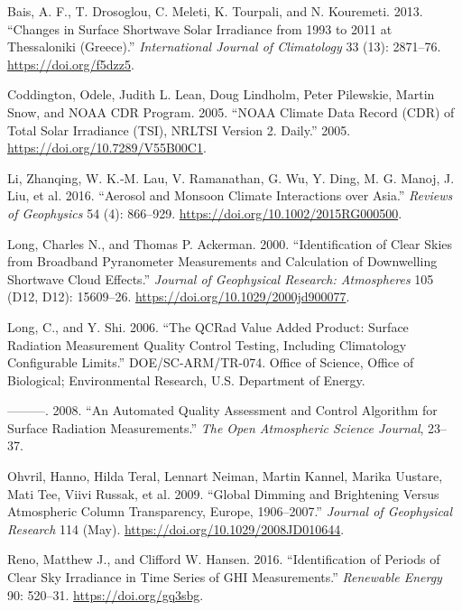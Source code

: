 \documentclass[
  preprint, 3p, authoryear]{article}
\newlength{\cslhangindent}
\newlength{\cslentryspacingunit} %
\newenvironment{CSLReferences}[2] %
 {%
  \setlength{\parindent}{0pt}
  \ifodd #1
  \let\oldpar\par
  \def\par{\hangindent=\cslhangindent\oldpar}
  \fi
  \setlength{\parskip}{#2\cslentryspacingunit}
 }%
 {}
\begin{document}
\hypertarget{refs}{}
\begin{CSLReferences}{1}{0}
\leavevmode{}%
Bais, A. F., T. Drosoglou, C. Meleti, K. Tourpali, and N. Kouremeti. 2013. {``Changes in Surface Shortwave Solar Irradiance from 1993 to 2011 at Thessaloniki (Greece).''} \emph{International Journal of Climatology} 33 (13): 2871--76. \url{https://doi.org/f5dzz5}.

\leavevmode{}%
Coddington, Odele, Judith L. Lean, Doug Lindholm, Peter Pilewskie, Martin Snow, and NOAA CDR Program. 2005. {``{NOAA} Climate Data Record ({CDR}) of Total Solar Irradiance ({TSI}), {NRLTSI} Version 2. {D}aily.''} 2005. \url{https://doi.org/10.7289/V55B00C1}.

\leavevmode{}%
Li, Zhanqing, W. K.‐M. Lau, V. Ramanathan, G. Wu, Y. Ding, M. G. Manoj, J. Liu, et al. 2016. {``Aerosol and Monsoon Climate Interactions over Asia.''} \emph{Reviews of Geophysics} 54 (4): 866--929. \url{https://doi.org/10.1002/2015RG000500}.

\leavevmode{}%
Long, Charles N., and Thomas P. Ackerman. 2000. {``Identification of Clear Skies from Broadband Pyranometer Measurements and Calculation of Downwelling Shortwave Cloud Effects.''} \emph{Journal of Geophysical Research: Atmospheres} 105 (D12, D12): 15609--26. \url{https://doi.org/10.1029/2000jd900077}.

\leavevmode{}%
Long, C., and Y. Shi. 2006. {``The QCRad Value Added Product: Surface Radiation Measurement Quality Control Testing, Including Climatology Configurable Limits.''} DOE/SC-ARM/TR-074. Office of Science, Office of Biological; Environmental Research, U.S. Department of Energy.

\leavevmode{}%
---------. 2008. {``An Automated Quality Assessment and Control Algorithm for Surface Radiation Measurements.''} \emph{The Open Atmospheric Science Journal}, 23--37.

\leavevmode{}%
Ohvril, Hanno, Hilda Teral, Lennart Neiman, Martin Kannel, Marika Uustare, Mati Tee, Viivi Russak, et al. 2009. {``Global Dimming and Brightening Versus Atmospheric Column Transparency, Europe, 1906--2007.''} \emph{Journal of Geophysical Research} 114 (May). \url{https://doi.org/10.1029/2008JD010644}.

\leavevmode{}%
Reno, Matthew J., and Clifford W. Hansen. 2016. {``Identification of Periods of Clear Sky Irradiance in Time Series of GHI Measurements.''} \emph{Renewable Energy} 90: 520--31. \url{https://doi.org/gq3sbg}.


\end{CSLReferences}
\end{document}
